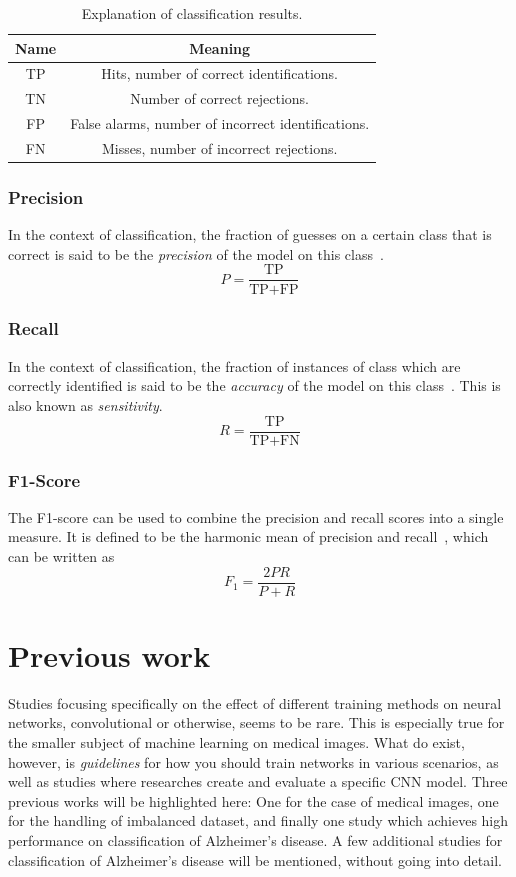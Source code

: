 \documentclass{kththesis}
\begin{document}
\begin{table}[H]
  \begin{center}
    \begin{tabular}{cc}
      \textbf{Name} & \textbf{Meaning} \\
      \toprule
      TP & Hits, number of correct identifications. \\
      TN & Number of correct rejections. \\
      FP & False alarms, number of incorrect identifications. \\
      FN & Misses, number of incorrect rejections.
    \end{tabular}
  \end{center}
  \caption{Explanation of classification results.}
  \label{tab:tp_mm}
\end{table}

\subsubsection{Precision}
In the context of classification, the fraction of guesses on a certain class that is correct is said to be the \textit{precision} of the model on this class~\cite[p.~5]{irbook}.
\[ P = \frac{\text{TP}}{\text{TP} + \text{FP}} \]

\subsubsection{Recall}
In the context of classification, the fraction of instances of class which are correctly identified is said to be the \textit{accuracy} of the model on this class~\cite[p.~5]{irbook}. This is also known as \textit{sensitivity}.
\[ R = \frac{\text{TP}}{\text{TP} + \text{FN}} \]

\subsubsection{F1-Score}
The F1-score can be used to combine the precision and recall scores into a single measure. It is defined to be the harmonic mean of precision and recall~\cite[p.~156-167]{irbook}, which can be written as
\[ F_1 = \frac{2PR}{P + R} \]

\section{Previous work}
Studies focusing specifically on the effect of different training methods on neural networks, convolutional or otherwise, seems to be rare. This is especially true for the smaller subject of machine learning on medical images.
What do exist, however, is \textit{guidelines} for how you should train networks in various scenarios, as well as studies where researches create and evaluate a specific CNN model. Three previous works will be highlighted here: One for the case of medical images, one for the handling of imbalanced dataset, and finally one study which achieves high performance on classification of Alzheimer's disease. A few additional studies for classification of Alzheimer's disease will be mentioned, without going into detail.
\end{document}
